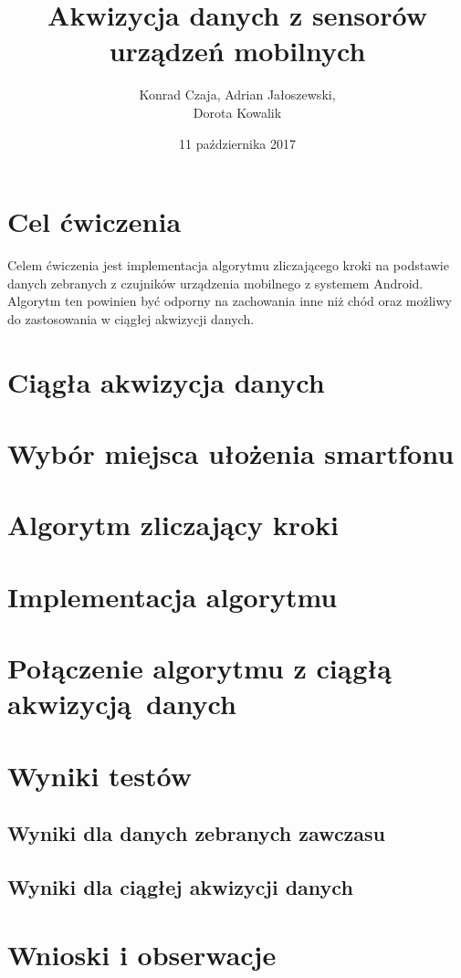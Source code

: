 \documentclass[a4paper, 12pt, titlepage]{article}
\author{Konrad Czaja, Adrian Jałoszewski,\\Dorota Kowalik}
\title{Akwizycja danych z sensorów urządzeń mobilnych}
\date{11 października 2017}
\begin{document}
    \maketitle
	\section{Cel ćwiczenia}
        Celem ćwiczenia jest implementacja algorytmu zliczającego kroki na
        podstawie danych zebranych z czujników urządzenia mobilnego z systemem
        Android. Algorytm ten powinien być odporny na zachowania inne niż chód
        oraz możliwy do zastosowania w ciągłej akwizycji danych.
	\section{Ciągła akwizycja danych}
        
    \section{Wybór miejsca ułożenia smartfonu}
    \section{Algorytm zliczający kroki}
%            
    \section{Implementacja algorytmu}
        
    \section{Połączenie algorytmu z ciągłą akwizycją danych}   
        
    \section{Wyniki testów}
        \subsection{Wyniki dla danych zebranych zawczasu}
        \subsection{Wyniki dla ciągłej akwizycji danych}
    \section{Wnioski i obserwacje}
\end{document}
